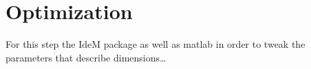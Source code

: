 \section{\textsf{Optimization}}
    For this step the IdeM package as well as matlab in order to tweak the parameters that
    describe dimensions\dots